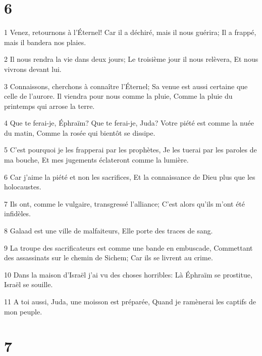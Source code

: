 \chapter{6}

\par 1 Venez, retournons à l'Éternel! Car il a déchiré, mais il nous guérira; Il a frappé, mais il bandera nos plaies.
\par 2 Il nous rendra la vie dans deux jours; Le troisième jour il nous relèvera, Et nous vivrons devant lui.
\par 3 Connaissons, cherchons à connaître l'Éternel; Sa venue est aussi certaine que celle de l'aurore. Il viendra pour nous comme la pluie, Comme la pluie du printemps qui arrose la terre.
\par 4 Que te ferai-je, Éphraïm? Que te ferai-je, Juda? Votre piété est comme la nuée du matin, Comme la rosée qui bientôt se dissipe.
\par 5 C'est pourquoi je les frapperai par les prophètes, Je les tuerai par les paroles de ma bouche, Et mes jugements éclateront comme la lumière.
\par 6 Car j'aime la piété et non les sacrifices, Et la connaissance de Dieu plus que les holocaustes.
\par 7 Ils ont, comme le vulgaire, transgressé l'alliance; C'est alors qu'ils m'ont été infidèles.
\par 8 Galaad est une ville de malfaiteurs, Elle porte des traces de sang.
\par 9 La troupe des sacrificateurs est comme une bande en embuscade, Commettant des assassinats sur le chemin de Sichem; Car ils se livrent au crime.
\par 10 Dans la maison d'Israël j'ai vu des choses horribles: Là Éphraïm se prostitue, Israël se souille.
\par 11 A toi aussi, Juda, une moisson est préparée, Quand je ramènerai les captifs de mon peuple.

\chapter{7}

